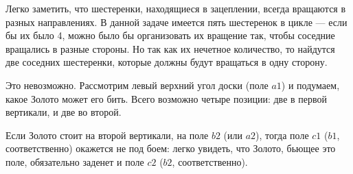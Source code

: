 ﻿
\begin{itemize}
\itA Легко заметить, что шестеренки, находящиеся в зацеплении, всегда вращаются в 
разных направлениях. В данной задаче имеется пять шестеренок в цикле —
если бы их было 4, можно было бы организовать их вращение так, чтобы соседние
вращались в разные стороны. Но так как их нечетное количество, то найдутся две
соседних шестеренки, которые должны будут вращаться в одну сторону.

\itB 
%
%
Это невозможно. Рассмотрим левый верхний угол доски (поле $a1$) и подумаем, какое
Золото может его бить. Всего возможно четыре позиции: две в первой вертикали, и две во второй.

Если Золото стоит на второй вертикали, на поле $b2$ (или $a2$), тогда поле $c1$ ($b1$, 
соответственно) окажется не под боем: легко увидеть, что Золото, бьющее это поле, обязательно 
заденет и поле $c2$ ($b2$, соответственно).

\begin{center}\end{center}




\end{itemize}

